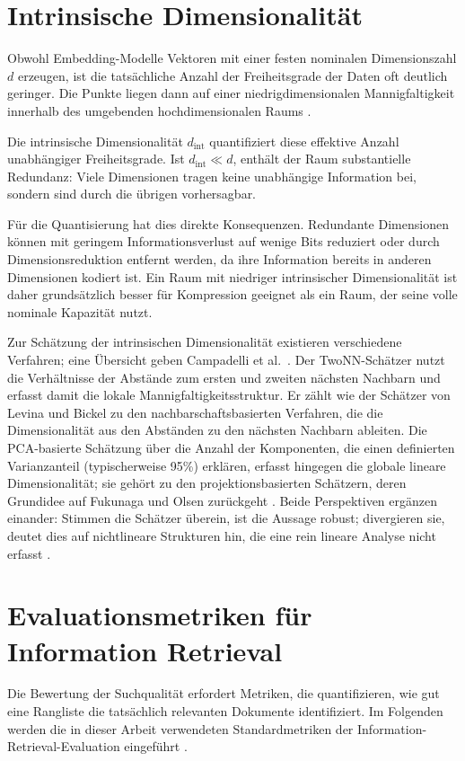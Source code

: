 \section{Intrinsische Dimensionalität}
\label{sec:grundlagen_intdim}
%
Obwohl Embedding-Modelle Vektoren mit einer festen nominalen Dimensionszahl $d$ erzeugen, ist die tatsächliche Anzahl der Freiheitsgrade der Daten oft deutlich geringer.
Die Punkte liegen dann auf einer niedrigdimensionalen Mannigfaltigkeit innerhalb des umgebenden hochdimensionalen Raums \cite{campadelli_2015_intrinsic}.
\par
Die intrinsische Dimensionalität $d_\text{int}$ quantifiziert diese effektive Anzahl unabhängiger Freiheitsgrade.
Ist $d_\text{int} \ll d$, enthält der Raum substantielle Redundanz: Viele Dimensionen tragen keine unabhängige Information bei, sondern sind durch die übrigen vorhersagbar.
\par
Für die Quantisierung hat dies direkte Konsequenzen.
Redundante Dimensionen können mit geringem Informationsverlust auf wenige Bits reduziert oder durch Dimensionsreduktion entfernt werden, da ihre Information bereits in anderen Dimensionen kodiert ist.
Ein Raum mit niedriger intrinsischer Dimensionalität ist daher grundsätzlich besser für Kompression geeignet als ein Raum, der seine volle nominale Kapazität nutzt.
\par
Zur Schätzung der intrinsischen Dimensionalität existieren verschiedene Verfahren; eine Übersicht geben Campadelli et al.\ \cite{campadelli_2015_intrinsic}.
Der TwoNN-Schätzer \cite{facco_2017_twonn} nutzt die Verhältnisse der Abstände zum ersten und zweiten nächsten Nachbarn und erfasst damit die lokale Mannigfaltigkeitsstruktur.
Er zählt wie der Schätzer von Levina und Bickel \cite{levina_2004_mle} zu den nachbarschaftsbasierten Verfahren, die die Dimensionalität aus den Abständen zu den nächsten Nachbarn ableiten.
Die PCA-basierte Schätzung über die Anzahl der Komponenten, die einen definierten Varianzanteil (typischerweise 95\%) erklären, erfasst hingegen die globale lineare Dimensionalität; sie gehört zu den projektionsbasierten Schätzern, deren Grundidee auf Fukunaga und Olsen zurückgeht \cite{fukunaga_1971_intrinsic,campadelli_2015_intrinsic}.
Beide Perspektiven ergänzen einander: Stimmen die Schätzer überein, ist die Aussage robust; divergieren sie, deutet dies auf nichtlineare Strukturen hin, die eine rein lineare Analyse nicht erfasst \cite{campadelli_2015_intrinsic}.
%
%
\section{Evaluationsmetriken für Information Retrieval}
\label{sec:grundlagen_metriken}
%
Die Bewertung der Suchqualität erfordert Metriken, die quantifizieren, wie gut eine Rangliste die tatsächlich relevanten Dokumente identifiziert.
Im Folgenden werden die in dieser Arbeit verwendeten Standardmetriken der Information-Retrieval-Evaluation eingeführt \cite{manning_2008_ir}.
%

